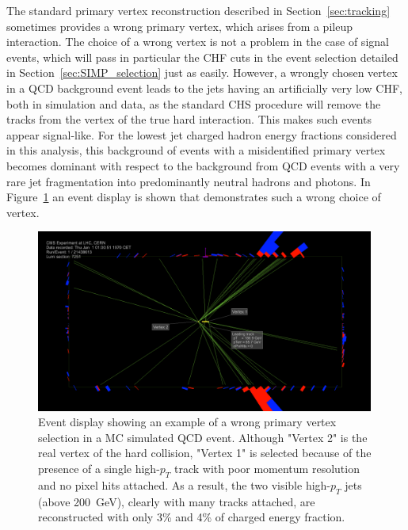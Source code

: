 The standard primary  vertex reconstruction described in Section~\ref{sec:tracking} sometimes provides a wrong primary vertex, which arises from a pileup interaction. The choice of a wrong vertex is not a problem in the case of signal events, which will pass in particular the CHF cuts in the event selection detailed in Section~\ref{sec:SIMP_selection} just as easily. However, a wrongly chosen vertex in a \acs{QCD} background event leads to the jets having an artificially very low CHF, both in simulation and data, as the standard \acf{CHS} procedure will remove the tracks from the vertex of the true hard interaction. This makes such events appear signal-like. For the lowest jet charged hadron energy fractions considered in this analysis, this background of events with a misidentified primary vertex becomes dominant with respect to the background from \acs{QCD} events with a very rare jet fragmentation into predominantly neutral hadrons and photons. In Figure~\ref{fig:wrongvertex} an event display is shown that demonstrates such a wrong choice of vertex.

\begin{figure}[ht]
  \centering
  \includegraphics[width=0.99\textwidth]{figures/wrongvertex.png}
  \caption{Event display showing an example of a wrong primary vertex selection in a MC simulated QCD event. Although "Vertex 2" is the real vertex of the hard collision, "Vertex 1" is selected because of the presence of a single high-$p_T$ track with poor momentum resolution and no pixel hits attached. As a result, the two visible high-$p_T$ jets (above \SI{200}{GeV}), clearly with many tracks attached, are reconstructed with only 3\% and 4\% of charged energy fraction.}
  \label{fig:wrongvertex}
\end{figure} 

